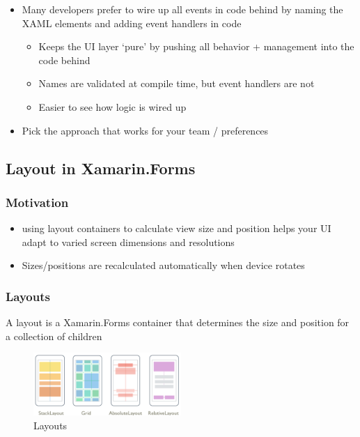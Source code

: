 \documentclass{article}
\begin{document}
\begin{itemize}
    \item Many developers prefer to wire up all events in code behind by naming the XAML elements and adding event handlers in code
    \begin{itemize}
        \item Keeps the UI layer `pure' by pushing all behavior + management into the code behind
        \item Names are validated at compile time, but event handlers are not
        \item Easier to see how logic is wired up
    \end{itemize}
    \item Pick the approach that works for your team / preferences
\end{itemize}

\subsection{Layout in Xamarin.Forms}

\subsubsection{Motivation}
\begin{itemize}
    \item using layout containers to calculate view size and position helps your UI adapt to varied screen dimensions and resolutions
    \item Sizes/positions are recalculated automatically when device rotates
\end{itemize}

\subsubsection{Layouts}

A layout is a Xamarin.Forms container that determines the size and position for a collection of children

\begin{figure}[H]
    \centering
    \includegraphics[width=0.5\textwidth]{xaml-layout.png}
    \caption{Layouts}
\end{figure}
\end{document}
